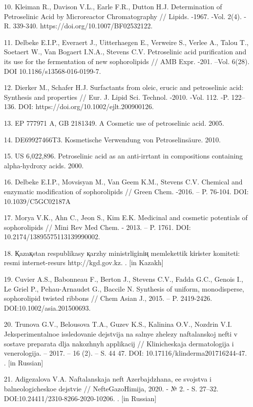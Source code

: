 10. Kleiman R., Davison V.L., Earle F.R., Dutton H.J. Determination of
Petroselinic Acid by Microreactor Chromatography // Lipids. -1967. -Vol.
2(4). - R. 339-340. https://doi.org/10.1007/BF02532122.

11. Delbeke E.I.P., Everaert J., Uitterhaegen E., Verweire S., Verlee
A., Talou T., Soetaert W., Van Bogaert I.N.A., Stevens C.V. Petroselinic
acid purification and its use for the fermentation of new sophorolipids
// AMB Expr. -201. --Vol. 6(28). DOI 10.1186/s13568-016-0199-7.

12. Dierker M., Schafer H.J. Surfactants from oleic, erucic and
petroselinic acid: Synthesis and properties // Eur. J. Lipid Sci.
Technol. -2010. -Vol. 112. -P. 122--136. DOI:
https://doi.org/10.1002/ejlt.200900126.

13. EP 777971 A, GB 2181349. A Cosmetic use of petroselinic acid. 2005.

14. DE69927466T3. Kosmetische Verwendung von Petroselinsäure. 2010.

15. US 6,022,896. Petroselinic acid as an anti-irrtant in compositions
containing alpha-hydroxy acids. 2000.

16. Delbeke E.I.P., Movsisyan M., Van Geem K.M., Stevens C.V. Chemical
and enzymatic modification of sophorolipids // Green Chem. -2016. -- P.
76-104. DOI: 10.1039/C5GC02187A

17. Morya V.K., Ahn C., Jeon S., Kim E.K. Medicinal and cosmetic
potentials of sophorolipids // Mini Rev Med Chem. - 2013. -- P. 1761.
DOI: 10.2174/13895575113139990002.

18. Қazaқstan respublikasy қarzhy ministrlіgіnің memlekettіk kіrіster
komitetі: resmi internet-resurs http://kgd.gov.kz. . {[}in Kazakh{]}

19. Cuvier A.S., Babonneau F., Berton J., Stevens C.V., Fadda G.C.,
Genois I., Le Griel P., Pehau-Arnaudet G., Baccile N. Synthesis of
uniform, monodisperse, sophorolipid twisted ribbons // Chem Asian J.,
2015. -- P. 2419-2426. DOI:10.1002/asia.201500693.

20. Trunova G.V., Belousova T.A., Guzev K.S., Kalinina O.V., Nozdrin
V.I. Jeksperimental\textquotesingle noe issledovanie dejstvija na
sal\textquotesingle nye zhelezy naftalanskoj nefti v sostave preparata
dlja nakozhnyh applikacij // Klinicheskaja dermatologija i venerologija.
-- 2017. -- 16 (2). -- S. 44 47. DOI: 10.17116/klinderma201716244-47. .
{[}in Russian{]}

21. Adigezalova V.A. Naftalanskaja neft\textquotesingle{} Azerbajdzhana,
ee svojstva i bal\textquotesingle neologicheskoe dejstvie //
NefteGazoHimija, 2020. - № 2. - S. 27--32.
DOI:10.24411/2310-8266-2020-10206. . {[}in Russian{]}

